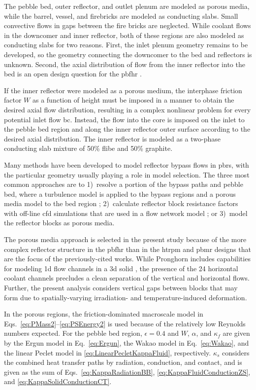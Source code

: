 The pebble bed, outer reflector, and outlet plenum are modeled as porous media, while the barrel, vessel, and firebricks are modeled as conducting slabs. Small convective flows in gaps between the fire bricks are neglected. While coolant flows in the downcomer and inner reflector, both of these regions are also modeled as conducting slabs for two reasons. First, the inlet plenum geometry remains to be developed, so the geometry connecting the downcomer to the bed and reflectors is unknown. Second, the axial distribution of flow from the inner reflector into the bed is an open design question for the \gls{pbfhr} \cite{pbfhr,xin_wang_thesis,scarlat}. 

If the inner reflector were modeled as a porous medium, the interphase friction factor \(W\) as a function of height must be imposed in a manner to obtain the desired axial flow distribution, resulting in a complex nonlinear problem for every potential inlet flow \gls{bc}. Instead, the flow into the core is imposed on the inlet to the pebble bed region and along the inner reflector outer surface according to the desired axial distribution. The inner reflector is modeled as a two-phase conducting slab mixture of 50\% \gls{flibe} and 50\% graphite.

Many methods have been developed to model reflector bypass flows in \glspl{pbr}, with the particular geometry usually playing a role in model selection. The three most common approaches are to 1)~resolve a portion of the bypass paths and pebble bed, where a turbulence model is applied to the bypass regions and a porous media model to the bed region \cite{ximing,rensburg}; 2)~calculate reflector block resistance factors with off-line \gls{cfd} simulations that are used in a flow network model \cite{jun2011, liu_2018,wyk}; or 3)~model the reflector blocks as porous media.

The porous media approach is selected in the present study because of the more complex reflector structure in the \gls{pbfhr} than in the \gls{htrpm} and \gls{pbmr} designs that are the focus of the previously-cited works. While Pronghorn includes capabilities for modeling \gls{1d} flow channels in a \gls{3d} solid \cite{nrc_2020}, the presence of the 24 horizontal coolant channels precludes a clean separation of the vertical and horizontal flows. Further, the present analysis considers vertical gaps between blocks that may form due to spatially-varying irradiation- and temperature-induced deformation. 

In the porous regions, the friction-dominated macroscale model in Eqs.\ \eqref{eq:PMass2}--\eqref{eq:PSEnergy2} is used because of the relatively low Reynolds numbers expected. For the pebble bed region, \(\epsilon=0.4\) and \(W\), \(\alpha\), and \(\kappa_f\) are given by the Ergun model in Eq.\ \eqref{eq:Ergun}, the Wakao model in Eq.\ \eqref{eq:Wakao}, and the linear Peclet model in \eqref{eq:LinearPecletKappaFluid}, respectively. \(\kappa_s\) considers the combined heat transfer paths by radiation, conduction, and contact, and is given as the sum of Eqs.\ \eqref{eq:KappaRadiationBB}, \eqref{eq:KappaFluidConductionZS}, and \eqref{eq:KappaSolidConductionCT}. 

